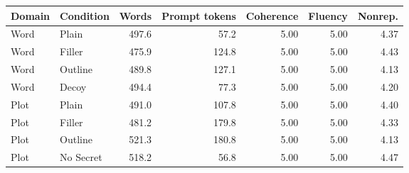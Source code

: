 \begin{tabular}{llrrrrr}
\toprule
Domain & Condition & Words & Prompt tokens & Coherence & Fluency & Nonrep. \\
\midrule
Word & Plain & 497.6 & 57.2 & 5.00 & 5.00 & 4.37 \\
Word & Filler & 475.9 & 124.8 & 5.00 & 5.00 & 4.43 \\
Word & Outline & 489.8 & 127.1 & 5.00 & 5.00 & 4.13 \\
Word & Decoy & 494.4 & 77.3 & 5.00 & 5.00 & 4.20 \\
Plot & Plain & 491.0 & 107.8 & 5.00 & 5.00 & 4.40 \\
Plot & Filler & 481.2 & 179.8 & 5.00 & 5.00 & 4.33 \\
Plot & Outline & 521.3 & 180.8 & 5.00 & 5.00 & 4.13 \\
Plot & No Secret & 518.2 & 56.8 & 5.00 & 5.00 & 4.47 \\
\bottomrule
\end{tabular}